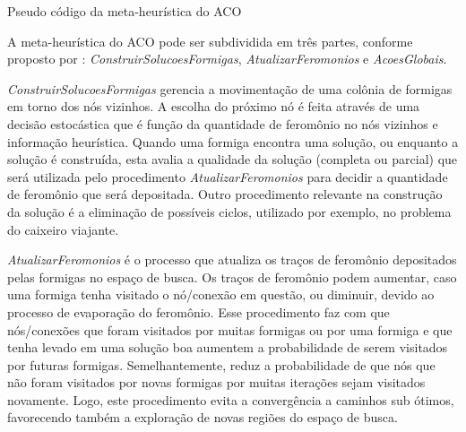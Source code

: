 \begin{algorithm}[H]


  \caption{Pseudo código da meta-heurística do ACO\label{lst:meta-heuristica_aco}}
\end{algorithm}

A meta-heurística do ACO pode ser subdividida em três partes,
conforme proposto por \cite{doringo2004ant}: \textit{ConstruirSolucoesFormigas},
\textit{AtualizarFeromonios} e \textit{AcoesGlobais}.

\textit{ConstruirSolucoesFormigas} gerencia a movimentação de uma colônia de formigas
em torno dos nós vizinhos. A escolha do próximo nó é feita através de uma decisão
estocástica que é função da quantidade de feromônio no nós vizinhos e informação heurística.
Quando uma formiga encontra uma solução, ou enquanto a solução é construída, esta avalia a
qualidade da solução (completa ou parcial) que será utilizada pelo procedimento
\textit{AtualizarFeromonios} para decidir a quantidade de feromônio que será depositada.
Outro procedimento relevante na construção da solução é a eliminação de possíveis ciclos, utilizado
por exemplo, no problema do caixeiro viajante.

\textit{AtualizarFeromonios} é o processo que atualiza os traços de feromônio depositados pelas
formigas no espaço de busca. Os traços de feromônio podem aumentar, caso uma formiga tenha visitado
o nó/conexão em questão, ou diminuir, devido ao processo de evaporação do feromônio. Esse procedimento faz com 
que nós/conexões que foram visitados por muitas formigas ou por uma formiga e que tenha levado em
uma solução boa aumentem a probabilidade de serem visitados por futuras formigas. Semelhantemente, reduz 
a probabilidade de que nós que não foram visitados por novas formigas por muitas iterações sejam visitados
novamente. Logo, este procedimento evita a convergência a caminhos sub ótimos, favorecendo também a exploração
de novas regiões do espaço de busca.

